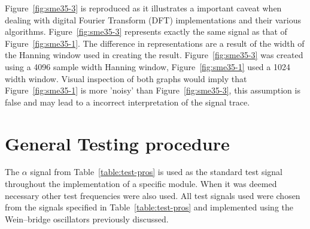 Figure~\ref{fig:sme35-3} is reproduced as it illustrates a important
caveat when dealing with digital Fourier Transform (DFT)
implementations and their various algorithms. Figure~\ref{fig:sme35-3}
represents exactly the same signal as that of
Figure~\ref{fig:sme35-1}. The difference in representations are a
result of the width of the Hanning window used in creating the
result. Figure~\ref{fig:sme35-3} was created using a 4096 sample width
Hanning window, Figure~\ref{fig:sme35-1} used a 1024 width
window. Visual inspection of both graphs would imply that
Figure~\ref{fig:sme35-1} is more 'noisy' than
Figure~\ref{fig:sme35-3}, this assumption is false and may lead to a
incorrect interpretation of the signal trace.

\section{General Testing procedure} \label{section:test-proc}

The $\alpha$ signal from Table~\ref{table:test-pros} is used as the
standard test signal throughout the implementation of a specific
module. When it was deemed necessary other test frequencies were also
used. All test signals used were chosen from the signals specified in
Table~\ref{table:test-pros} and implemented using the Wein--bridge
oscillators previously discussed.


